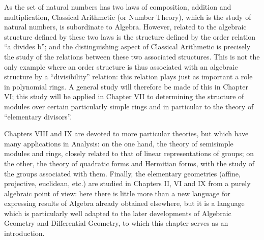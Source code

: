 As the set of natural numbers has two laws of composition, addition and multiplication, Classical Arithmetic (or Number Theory), which is the study of natural numbers, is subordinate to Algebra. However, related to the algebraic structure defined by these two laws is the structure defined by the order relation ``a divides b''; and the distinguishing aspect of Classical Arithmetic is precisely the study of the relations between these two associated structures. This is not the only example where an order structure is thus associated with an algebraic structure by a ``divisibility'' relation: this relation plays just as important a role in polynomial rings. A general study will therefore be made of this in Chapter VI; this study will be applied in Chapter VII to determining the structure of modules over certain particularly simple rings and in particular to the theory of ``elementary divisors''.

Chapters VIII and IX are devoted to more particular theories, but which have many applications in Analysis: on the one hand, the theory of semisimple modules and rings, closely related to that of linear representations of groups; on the other, the theory of quadratic forms and Hermitian forms, with the study of the groups associated with them. Finally, the elementary geometries (affine, projective, euclidean, etc.) are studied in Chapters II, VI and IX from a purely algebraic point of view: here there is little more than a new language for expressing results of Algebra already obtained elsewhere, but it is a language which is particularly well adapted to the later developments of Algebraic Geometry and Differential Geometry, to which this chapter serves as an introduction.

